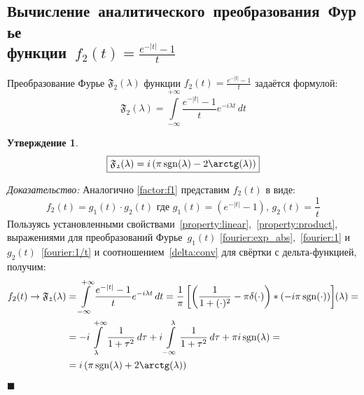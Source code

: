 \documentclass[11pt, oneside, final]{article} \sloppy
\numberwithin{equation}{section}
\newtheorem*{statement}{Утверждение}
\renewenvironment{proof}{
\noindent\textit{Доказательство: }} {\qed}
\newcommand \rarrow{\rightarrow}
\newcommand \intinf[1][{\,dt}]{ \int\limits_{-\infty}^{+\infty}{{#1}}}
\renewcommand \qed{$\blacksquare$}
\DeclareMathOperator{\sgn}{sgn}
\begin{document}
\subsection{Вычисление~аналитического~преобразования~Фурье\\функции~\(f_2(t) = \frac{e^{-|t|} - 1}{t} \)} Преобразование Фурье \( \mathfrak{F_2} (\lambda)\) функции \(f_2(t) = \frac{e^{-|t|} - 1}{t} \) задаётся формулой:
\[ \mathfrak{F_2} (\lambda) = \intinf[{\dfrac{e^{-|t|} - 1}{t} e^{-i\lambda t}\, dt}] \]
\begin{statement}
    \begin{equation}\label{fourier_transform:f2} 
        \boxed{ \mathfrak{F_2}(\lambda) = i\left(\pi\sgn(\lambda) - 2\arctg(\lambda)\right) } 
    \end{equation}
\end{statement}
\begin{proof}
    Аналогично \eqref{factor:f1} представим \(f_2(t) \) в виде: 
    \begin{equation}\label{factor:f2} 
        f_2(t) = g_1(t) \cdot g_2(t) \text{ где } g_1(t) = \left(e^{-|t|} - 1\right)\text{, }g_2(t) = \dfrac{1}{t} 
    \end{equation}
    Пользуясь установленными свойствами~\ref{property:linear},~\ref{property:product}, выражениями для преобразований Фурье~\(g_1(t)\) \eqref{fourier:exp_abs},~\eqref{fourier:1} и~\(g_2(t)\)~\eqref{fourier:1/t} и соотношением~\eqref{delta:conv} для свёртки с дельта-функцией, получим:
    \[ 
    \begin{split}
        f_2(t) \rarrow \mathfrak{F_2} (\lambda) &= \intinf[{ \dfrac{e^{-|t|} - 1}{t} e^{-i\lambda t}\, dt}] = \dfrac{1}{\pi}\left[\left({\dfrac{1}{1 + (\cdot)^2} - \pi\delta(\cdot)}\right) * \left({-i \pi \sgn(\cdot)}\right)\right] \negmedspace({\lambda}) = \\
        &= -i\int\limits_{\lambda}^{+\infty}{\dfrac{1}{1 + \tau^2}\, d\tau} + i\int\limits_{-\infty}^{\lambda}{\dfrac{1}{1 + \tau^2}\, d\tau} + \pi i \sgn(\lambda) = \\
        &= i\left(\pi \sgn(\lambda) + 2\arctg(\lambda)\right) 
    \end{split}
    \]
\end{proof}
\end{document}
